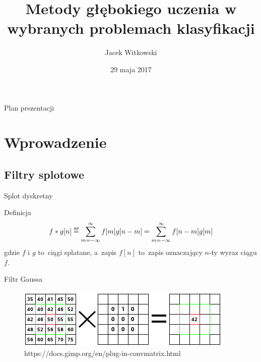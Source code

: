 \documentclass[xcolor=dvipsnames]{beamer}
\title[Obrona pracy dyplomowej]{Metody głębokiego uczenia w wybranych problemach klasyfikacji}
\subtitle[]{}
\author[J. Witkowski]{Jacek Witkowski}
\institute[Instytut Informatyki]{
  PW EiTI \\
  Instytut Informatyki \\
  promotor: mgr inż.~Rajmund Kożuszek
}
\date[Maj 2017]{29 maja 2017}
\newcommand\defeq{\mathrel{\overset{\makebox[0pt]{\mbox{\normalfont\tiny\sffamily def}}}{=}}}
\begin{document}
\begin{frame}[plain]
  \titlepage
\end{frame}

\begin{frame}{Plan prezentacji}
  \tableofcontents
\end{frame}


\section{Wprowadzenie}
\subsection{Filtry splotowe}
\begin{frame}{Splot dyskretny}
    \begin{block}{Definicja}
        \begin{equation*}
            f\ast g[n]\defeq \sum\limits_{m=-\infty}^{\infty}f[m]g[n-m] = \sum\limits_{m=-\infty}^{\infty}f[n-m]g[m]
        \end{equation*}
        gdzie $f$ i $g$ to~ciągi splatane, a~zapis $f[n]$ to~zapis oznaczający $n$-ty wyraz ciągu $f$.
    \end{block}
\end{frame}
\begin{frame}{Filtr Gaussa}
    \begin{figure}
		\includegraphics[width=\linewidth, keepaspectratio] {img/convolutional_filter.png}
		\caption{https://docs.gimp.org/en/plug-in-convmatrix.html}
	\end{figure}
\end{frame}
\end{document}

